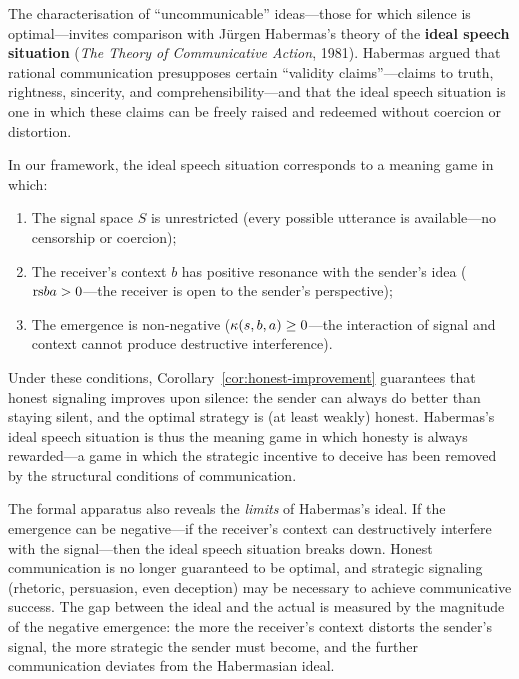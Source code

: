 \begin{interpretation}
\label{interp:ch14:habermas_speech}
The characterisation of ``uncommunicable'' ideas---those for which silence
is optimal---invites comparison with J\"urgen Habermas's theory of the
\textbf{ideal speech situation} (\emph{The Theory of Communicative Action},
1981).  Habermas argued that rational communication presupposes certain
``validity claims''---claims to truth, rightness, sincerity, and
comprehensibility---and that the ideal speech situation is one in which these
claims can be freely raised and redeemed without coercion or distortion.

In our framework, the ideal speech situation corresponds to a meaning game
in which:
\begin{enumerate}
\item The signal space $S$ is unrestricted (every possible utterance is
  available---no censorship or coercion);
\item The receiver's context $b$ has positive resonance with the sender's
  idea ($\mathrm{rs}{b}{a} > 0$---the receiver is open to the sender's perspective);
\item The emergence is non-negative ($\kappa(s, b, a) \geq 0$---the
  interaction of signal and context cannot produce destructive interference).
\end{enumerate}

Under these conditions, Corollary~\ref{cor:honest-improvement} guarantees
that honest signaling improves upon silence: the sender can always do better
than staying silent, and the optimal strategy is (at least weakly) honest.
Habermas's ideal speech situation is thus the meaning game in which honesty
is always rewarded---a game in which the strategic incentive to deceive has
been removed by the structural conditions of communication.

The formal apparatus also reveals the \emph{limits} of Habermas's ideal.
If the emergence can be negative---if the receiver's context can
destructively interfere with the signal---then the ideal speech situation
breaks down.  Honest communication is no longer guaranteed to be optimal, and
strategic signaling (rhetoric, persuasion, even deception) may be necessary
to achieve communicative success.  The gap between the ideal and the actual
is measured by the magnitude of the negative emergence: the more the
receiver's context distorts the sender's signal, the more strategic the
sender must become, and the further communication deviates from the
Habermasian ideal.
\end{interpretation}



